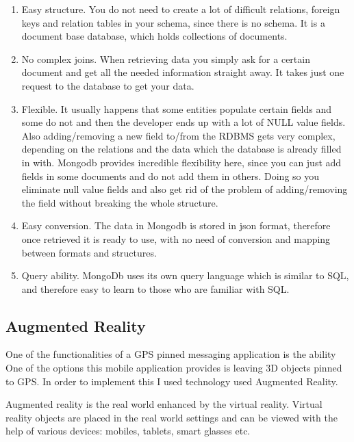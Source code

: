\documentclass[thesis=M,english]{FITthesis}[2012/10/20]
\begin{document}
\begin{enumerate}
\item{Easy structure.} You do not need to create a lot of difficult relations, foreign keys and relation tables in your schema, since there is no schema. It is a document base database, which holds collections of documents.

\item{No complex joins.} When retrieving data you simply ask for a certain document and get all the needed information straight away. It takes just one request to the database to get your data.

\item{Flexible.} It usually happens that some entities populate certain fields and some do not and then the developer ends up with a lot of NULL value fields. Also adding/removing a new field to/from the RDBMS gets very complex, depending on the relations and the data which the database is already filled in with. Mongodb provides incredible flexibility here, since you can just add fields in some documents and do not add them in others. Doing so you eliminate null value fields and also get rid of the problem of adding/removing the field without breaking the whole structure.

\item{Easy conversion.} The data in Mongodb is stored in json format, therefore once retrieved it is ready to use, with no need of conversion and mapping between formats and structures.

\item{Query ability.} MongoDb uses its own query language which is similar to SQL, and therefore easy to learn to those who are familiar with SQL.
\end{enumerate}

\subsection{Augmented Reality}

One of the functionalities of a GPS pinned messaging application is the ability 
One of the options this mobile application provides is leaving 3D objects pinned to GPS. In order to implement this I used technology used Augmented Reality.

Augmented reality is the real world enhanced by the virtual reality. Virtual reality objects are placed in the real world settings and can be viewed with the help of various devices: mobiles, tablets, smart glasses etc. 
\end{document}
